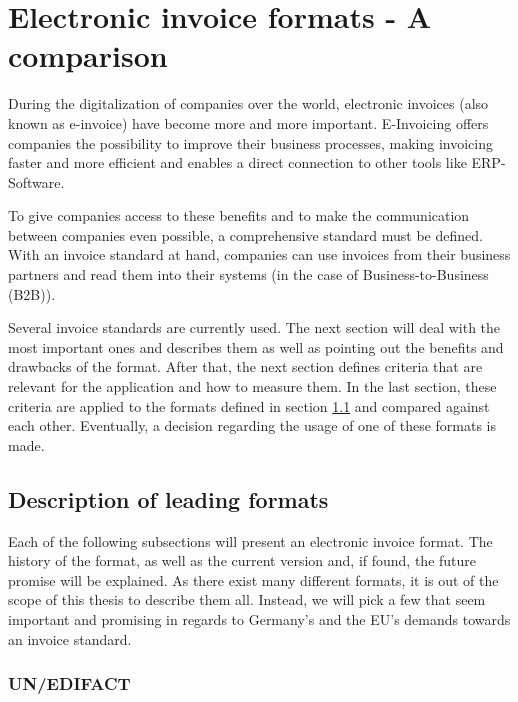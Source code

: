 %
% 
\chapter{Electronic invoice formats - A comparison}
\label{cha2}

During the digitalization of companies over the world, electronic invoices (also known as e-invoice) have become more and more important. E-Invoicing offers companies the possibility to improve their business processes, making invoicing faster and more efficient and enables a direct connection to other tools like ERP-Software. 

To give companies access to these benefits and to make the communication between companies even possible, a comprehensive standard must be defined. With an invoice standard at hand, companies can use invoices from their business partners and read them into their systems (in the case of Business-to-Business (B2B)). 

Several invoice standards are currently used. The next section will deal with the most important ones and describes them as well as pointing out the benefits and drawbacks of the format.
After that, the next section defines criteria that are relevant for the application and how to measure them.
In the last section, these criteria are applied to the formats defined in section \ref{sec2.1} and compared against each other. Eventually, a decision regarding the usage of one of these formats is made.

\section{Description of leading formats}
\label{sec2.1}

Each of the following subsections will present an electronic invoice format. The history of the format, as well as the current version and, if found, the future promise will be explained. As there exist many different formats, it is out of the scope of this thesis to describe them all.
Instead, we will pick a few that seem important and promising in regards to Germany's and the EU's demands towards an invoice standard. 

\subsection{UN/EDIFACT}
\label{sec2.1.1}

